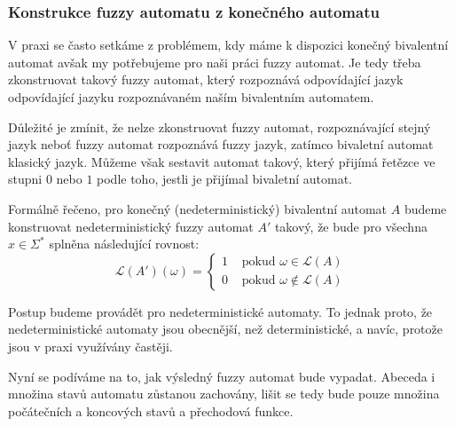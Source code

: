 \documentclass[a4paper,10pt]{article}
\begin{document}

\subsubsection*{Konstrukce fuzzy automatu z konečného automatu}
V praxi se často setkáme z problémem, kdy máme k dispozici konečný bivalentní automat avšak my potřebujeme pro naši práci fuzzy automat. Je tedy třeba zkonstruovat takový fuzzy automat, který rozpoznává odpovídající jazyk odpovídající jazyku rozpoznávaném naším bivalentním automatem. 

Důležité je zmínit, že nelze zkonstruovat fuzzy automat, rozpoznávající stejný jazyk neboť fuzzy automat rozpoznává fuzzy jazyk, zatímco bivaletní automat klasický  jazyk. Můžeme však sestavit automat takový, který přijímá řetězce ve stupni $0$ nebo $1$ podle toho, jestli je přijímal bivaletní automat.

Formálně řečeno, pro konečný (nedeterministický) bivalentní automat $A$ budeme konstruovat nedeterministický fuzzy automat $A'$ takový, že bude pro všechna $x \in \Sigma^*$ splněna následující rovnost:
$$
 \mathcal{L}(A')(\omega) = 
  \begin{cases}
   1 & \text{ pokud } \omega \in \mathcal{L}(A) \\
   0 & \text{ pokud } \omega \notin \mathcal{L}(A)
  \end{cases}
$$

\begin{note}
 Postup budeme provádět pro nedeterministické automaty. To jednak proto, že nedeterministické automaty jsou obecnější, než deterministické, a navíc, protože jsou v praxi využívány častěji. 
\end{note}

Nyní se podíváme na to, jak výsledný fuzzy automat bude vypadat. Abeceda i množina stavů automatu zůstanou zachovány, lišit se tedy bude pouze množina počátečních a koncových stavů a přechodová funkce. 
\end{document}
